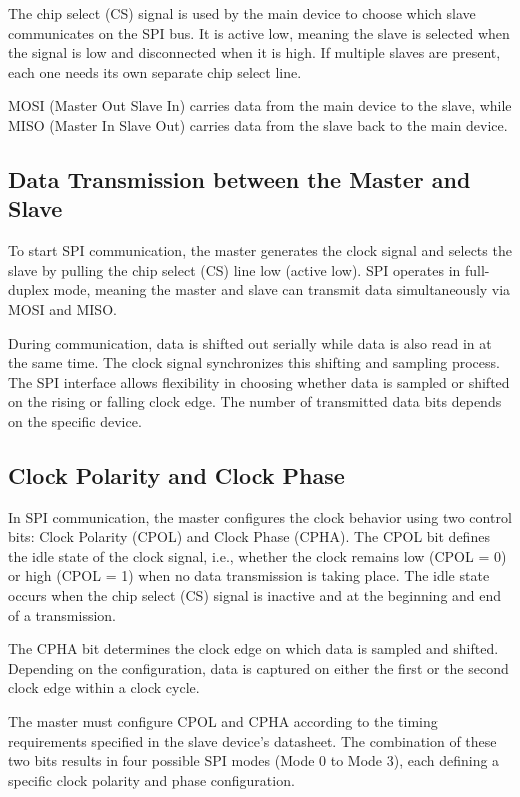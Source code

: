 The chip select (CS) signal is used by the main device to choose which slave communicates on the SPI bus. It is active low, meaning the slave is selected when the signal is low and disconnected when it is high. If multiple slaves are present, each one needs its own separate chip select line.

MOSI (Master Out Slave In) carries data from the main device to the slave, while MISO (Master In Slave Out) carries data from the slave back to the main device.

\subsection{Data Transmission between the Master and Slave}
To start SPI communication, the master generates the clock signal and selects the slave by pulling the chip select (CS) line low (active low). SPI operates in full-duplex mode, meaning the master and slave can transmit data simultaneously via MOSI and MISO.

During communication, data is shifted out serially while data is also read in at the same time. The clock signal synchronizes this shifting and sampling process. The SPI interface allows flexibility in choosing whether data is sampled or shifted on the rising or falling clock edge. The number of transmitted data bits depends on the specific device. 

\subsection{Clock Polarity and Clock Phase}
In SPI communication, the master configures the clock behavior using two control bits: Clock Polarity (CPOL) and Clock Phase (CPHA). The CPOL bit defines the idle state of the clock signal, i.e., whether the clock remains low (CPOL = 0) or high (CPOL = 1) when no data transmission is taking place. The idle state occurs when the chip select (CS) signal is inactive and at the beginning and end of a transmission.

The CPHA bit determines the clock edge on which data is sampled and shifted. Depending on the configuration, data is captured on either the first or the second clock edge within a clock cycle.

The master must configure CPOL and CPHA according to the timing requirements specified in the slave device’s datasheet. The combination of these two bits results in four possible SPI modes (Mode 0 to Mode 3), each defining a specific clock polarity and phase configuration.

